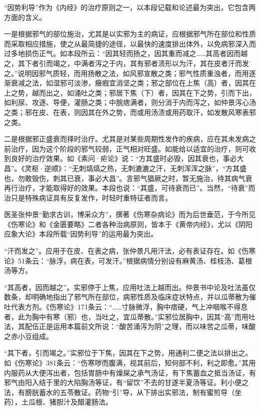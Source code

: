 \documentclass[draft,12pt]{ctexbook}
\begin{document}


“因势利导”作为《内经》的治疗原则之一，以本段记载和论述最为突出，它包含两方面的含义。

一是根据邪气的部位施治，尤其是以实邪为主的病证，应根据邪气所在部位和性质而采取相应措施，使之从最简捷的途径，以最快的速度排出体外，以免病邪深入而过多地损伤正气。如本段所云：“因其轻而扬之，因其重而减之……其高者因而越之，其下者引而竭之，中满者泻之于内，其有邪者渍形以为汗，其在皮者汗而发之。”说明因邪气质轻，而用扬散之法，如风邪宣散之类；邪气性质重浊者，而用逐渐衰减之法，如湿邪可淡渗，癥瘕宜消坚之类；邪之部位在上焦（高）者，因其在上之势，越而出之，如涌吐之类；邪居下焦（下）者，因其在下之势，引而下出，如利尿、攻逐、导便，灌肠之类；中脘痞满者，则分消于内而泻之，如仲景泻心汤之类；邪在皮、在表，则因其在外之势，而或用汤渍或用药取汗，如发散风寒表邪之类。

二是根据邪正盛衰而择时治疗。尤其是对某些周期性发作的疾病，应在其未发病之前治疗，因为这个阶段的邪气较弱，正气相对旺盛。如能给以适宜的治疗，则可收到良好的治疗效果。如《素问·疟论》说：“方其盛时必毁，因其衰也，事必大昌”。《灵枢·逆顺》：“无刺熇熇之热，无刺漉漉之汗，无刺浑浑之脉”，“方其盛也，勿敢毁伤，刺其已衰，事必大昌”。言邪气猖厥之时，暂无施治，待其病气衰再行治疗，才能取得好的效果。本段也说：“其盛，可待衰而已”。当然，“待衰”而治只是特殊病证具有反复发作，时轻时重特征者而言。



医圣张仲景“勤求古训，博采众方”，撰著《伤寒杂病论》而为后世垂范，于今所见《伤寒论》和《金匮要略》二者各种治病原则，皆本于《黄帝内经》，尤以《阴阳应象大论》本段所载“因势利导”的运用最为突出。

“汗而发之”。应用于在皮、在表之病，张仲景凡用汗法，必有表证存在。如《伤寒论》51条云：“脉浮，病在表，可发汗。”根据病情分别设有麻黄汤、桂枝汤、葛根汤等方。

“其高者，因而越之”。实邪停于上焦，应用吐法上越而出。仲景书中论及吐法虽仅数条，却明确地指出了邪气所在部位，病邪性质及临床症状特点，并以瓜蒂散为催吐代表方剂。《伤寒论》171条云：“……寸脉微浮，胸中痞硬，气上冲咽喉不得息者，此为胸中有寒（邪）也，当吐之，宜瓜蒂散。”实邪位居胸中，因其“高”而用吐法，其配伍正是运用本篇前文所说：“酸苦涌泻为阴”之理，而以味苦之瓜蒂，味酸之赤小豆组成。

“其下者，引而竭之。”实邪位于下焦，因其在下之势，用通利二便之法以排出之。如《伤寒论》381条云：“伤寒哕而腹满，视其前后，知何部不利，利之即愈。”其用内服药从大便泻出者，包括胃肠中有燥屎之承气汤证，有下焦蓄血之抵当汤证，有邪气由阳入结于里的大陷胸汤等证，有“留饮”不去的甘遂半夏汤等证。利小便之法，有膀胱蓄水的五苓散证。药物“引”导，从下排出实邪法，制有蜜煎导（坐药），土瓜根、猪胆汁及醋灌肠法。
\end{document}
